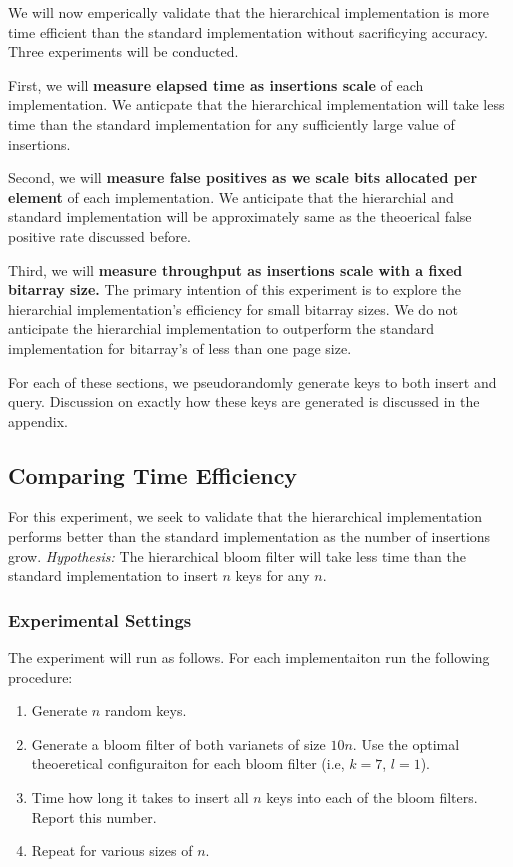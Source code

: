 We will now emperically validate that the hierarchical implementation is more time efficient than the standard implementation without sacrificying accuracy.
Three experiments will be conducted.

First, we will \textbf{measure elapsed time as insertions scale} of each implementation.
We anticpate that the hierarchical implementation will take less time than the standard implementation for any sufficiently large value of insertions.

Second, we will \textbf{measure false positives as we scale bits allocated per element} of each implementation.
We anticipate that the hierarchial and standard implementation will be approximately same as the theoerical false positive rate discussed before.

Third, we will \textbf{measure throughput as insertions scale with a fixed bitarray size.}
The primary intention of this experiment is to explore the hierarchial implementation's efficiency for small bitarray sizes.
We do not anticipate the hierarchial implementation to outperform the standard implementation for bitarray's of less than one page size.

For each of these sections, we pseudorandomly generate keys to both insert and query.
Discussion on exactly how these keys are generated is discussed in the appendix.


\subsection{Comparing Time Efficiency}

For this experiment, we seek to validate that the hierarchical implementation performs better than the standard implementation as the number of insertions grow.
\textit{Hypothesis:} The hierarchical bloom filter will take less time than the standard implementation to insert $n$ keys for any $n$.

\subsubsection{Experimental Settings}

The experiment will run as follows. For each implementaiton run the following procedure:
\begin{enumerate}
    \item Generate $n$ random keys.
    \item Generate a bloom filter of both varianets of size $10n$. Use the optimal theoeretical configuraiton for each bloom filter (i.e, $k=7$, $l=1$).
    \item Time how long it takes to insert all $n$ keys into each of the bloom filters. Report this number.
    \item Repeat for various sizes of $n$.
\end{enumerate}

